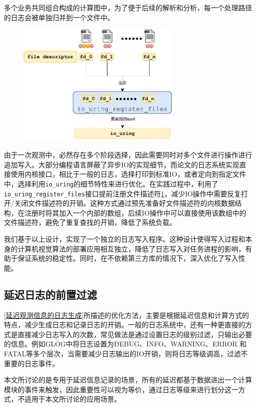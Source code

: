 \documentclass[master,anonymous]{shtthesis}
\begin{document}
多个业务共同组合构成的计算图中，为了便于后续的解析和分析，每一个处理路径的日志会被单独归并到一个文件中。
\begin{figure}[htbp]
	\centering
	\includegraphics[width=8cm]{img/reg.pdf}
	\label{延迟日志写入优化}
\end{figure}
由于一次观测中，必然存在多个阶段选择，因此需要同时对多个文件进行操作进行追加写入。大部分编程语言屏蔽了异步IO的实现细节，而论文的日志系统实现直接使用内核接口，相比于一般的日志，选择打印到标准IO，或者定向到指定文件中，选择利用\verb*|io_uring|的细节特性来进行优化。在实践过程中，利用了\verb*|io_uring_register_files|接口提前注册文件描述符\ref{延迟日志写入优化}，减少IO操作中需要反复打开/关闭文件描述符的开销。这种方式通过预先准备好文件描述符的内核数据结构，在注册时将其加入一个内部的数组，后续IO操作中可以直接使用该数组中的文件描述符，避免了重复查找的开销，降低了系统负载。

我们基于以上设计，实现了一个独立的日志写入程序。这种设计使得写入过程和本身的计算机视觉算法的部署应用相互独立，降低了日志写入对任务进程的影响，有助于保证系统的稳定性。同时，在不依赖第三方库的情况下，深入优化了写入性能。

\subsection{延迟日志的前置过滤}
\ref{延迟观测信息的日志生成}所描述的优化方法，主要是根据延迟信息和计算方式的特点，减少生成日志和记录日志的开销。一般的日志系统中，还有一种更直接的方式是直接减少日志写入的次数，常见做法是通过设置日志的级别过滤，只输出必要的信息。例如GLOG中将日志设置为DEBUG、INFO、WARNING、ERROR 和 FATAL等多个层次，当需要减少日志输出的IO开销，则将日志等级调高，过滤不重要的日志事件。

本文所讨论的是专用于延迟信息记录的场景，所有的延迟都基于数据进出一个计算模块的事件来触发，因此重要性可以视为等价，通过日志等级来进行划分这一方式，不适用于本文所讨论的应用场景。
\end{document}
